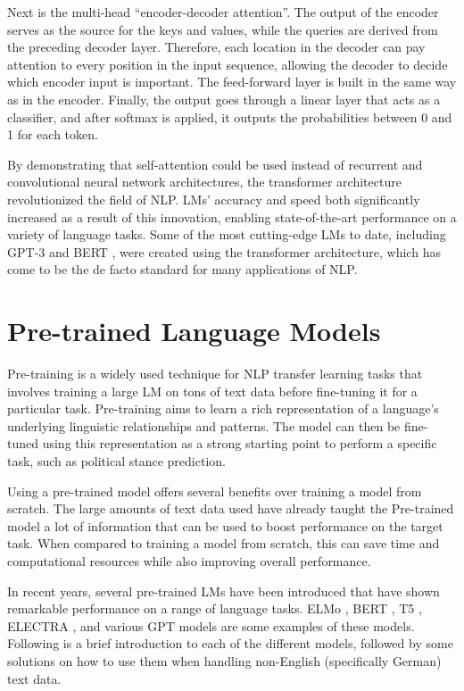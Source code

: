 Next is the multi-head ``encoder-decoder attention''. The output of the encoder serves as the source for the keys and values, while the queries are derived from the preceding decoder layer. Therefore, each location in the decoder can pay attention to every position in the input sequence, allowing the decoder to decide which encoder input is important. The feed-forward layer is built in the same way as in the encoder. Finally, the output goes through a linear layer that acts as a classifier, and after softmax is applied, it outputs the probabilities between 0 and 1 for each token.

By demonstrating that self-attention could be used instead of recurrent and convolutional neural network architectures, the transformer architecture revolutionized the field of NLP. LMs' accuracy and speed both significantly increased as a result of this innovation, enabling state-of-the-art performance on a variety of language tasks. Some of the most cutting-edge LMs to date, including GPT-3 \citep{brown2020gpt3} and BERT \citep{devlin2018bert}, were created using the transformer architecture, which has come to be the de facto standard for many applications of NLP.

\section{Pre-trained Language Models}\label{models}

Pre-training is a widely used technique for NLP transfer learning tasks that involves training a large LM on tons of text data before fine-tuning it for a particular task. Pre-training aims to learn a rich representation of a language's underlying linguistic relationships and patterns. The model can then be fine-tuned using this representation as a strong starting point to perform a specific task, such as political stance prediction.

Using a pre-trained model offers several benefits over training a model from scratch. The large amounts of text data used have already taught the Pre-trained model a lot of information that can be used to boost performance on the target task. When compared to training a model from scratch, this can save time and computational resources while also improving overall performance.

In recent years, several pre-trained LMs have been introduced that have shown remarkable performance on a range of language tasks. ELMo \citep{peters2018elmo}, BERT \citep{devlin2018bert}, T5 \citep{xue2020mt5}, ELECTRA \citep{clark2020electra}, and various GPT models \citep{radford2018gpt, radford2019language, brown2020gpt3} are some examples of these models. Following is a brief introduction to each of the different models, followed by some solutions on how to use them when handling non-English (specifically German) text data.

